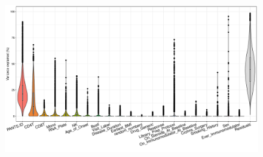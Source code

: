 \begin{outline}



\begin{figure}
    \centering
    \includegraphics[width=1.0\textwidth,page=1]{mainmatter/figures/chapter_04/dream.plotVarPart.pdf}
    \caption{}
    \label{fig:multipants_varPart}
\end{figure}


\end{outline}

